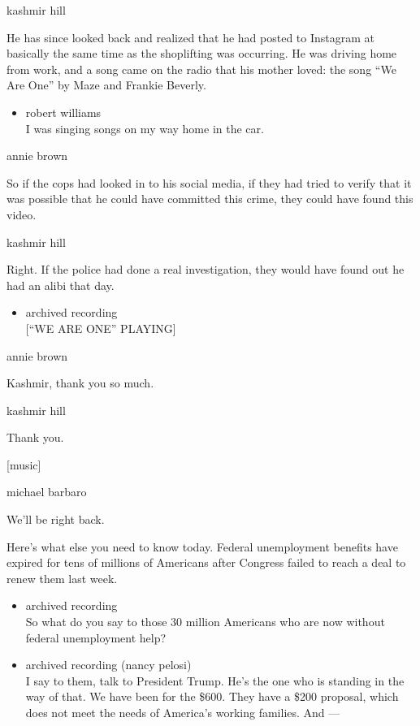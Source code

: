 kashmir hill

He has since looked back and realized that he had posted to Instagram at
basically the same time as the shoplifting was occurring. He was driving
home from work, and a song came on the radio that his mother loved: the
song ``We Are One'' by Maze and Frankie Beverly.

\begin{itemize}
\tightlist
\item
  robert williams\\
  I was singing songs on my way home in the car.
\end{itemize}

annie brown

So if the cops had looked in to his social media, if they had tried to
verify that it was possible that he could have committed this crime,
they could have found this video.

kashmir hill

Right. If the police had done a real investigation, they would have
found out he had an alibi that day.

\begin{itemize}
\tightlist
\item
  archived recording\\
  {[}``WE ARE ONE'' PLAYING{]}
\end{itemize}

annie brown

Kashmir, thank you so much.

kashmir hill

Thank you.

{[}music{]}

michael barbaro

We'll be right back.

Here's what else you need to know today. Federal unemployment benefits
have expired for tens of millions of Americans after Congress failed to
reach a deal to renew them last week.

\begin{itemize}
\item
  archived recording\\
  So what do you say to those 30 million Americans who are now without
  federal unemployment help?
\item
  archived recording (nancy pelosi)\\
  I say to them, talk to President Trump. He's the one who is standing
  in the way of that. We have been for the \$600. They have a \$200
  proposal, which does not meet the needs of America's working families.
  And ---
\end{itemize}

